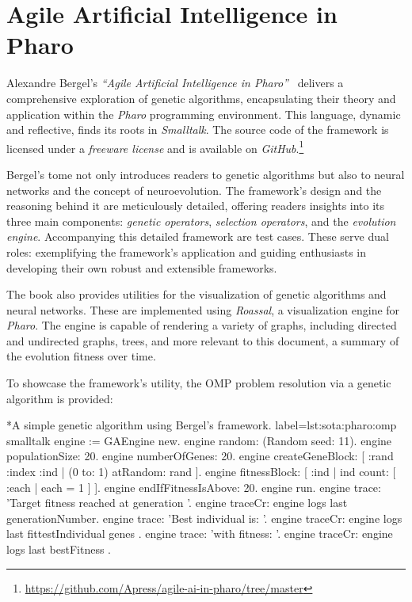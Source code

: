 
\section{Agile Artificial Intelligence in Pharo}
\label{sec:sota:pharo}
  Alexandre Bergel's \emph{\enquote{Agile Artificial Intelligence in 
  Pharo}}~\autocite{bergelAgileArtificialIntelligence2020} delivers a 
  comprehensive exploration of genetic algorithms, encapsulating their theory 
  and application within the \textit{Pharo} programming environment.
  This language, dynamic and reflective, finds its roots in \textit{Smalltalk}.
  The source code of the framework is licensed under a \textit{freeware license}
  and is available on 
  \textit{GitHub}.\footnote{\url{https://github.com/Apress/agile-ai-in-pharo/tree/master}}

  Bergel's tome not only introduces readers to genetic algorithms but also to 
  neural networks and the concept of neuroevolution.
  The framework's design and the reasoning behind it are meticulously detailed, 
  offering readers insights into its three main components: \emph{genetic 
  operators}, \emph{selection operators}, and the \emph{evolution engine}.
  Accompanying this detailed framework are test cases.
  These serve dual roles: exemplifying the framework's application and guiding 
  enthusiasts in developing their own robust and extensible frameworks.

  The book also provides utilities for the visualization of genetic algorithms
  and neural networks.
  These are implemented using \textit{Roassal}, a visualization engine for
  \textit{Pharo}.
  The engine is capable of rendering a variety of graphs, including directed and
  undirected graphs, trees, and more relevant to this document, a summary of the
  evolution fitness over time.
  
  To showcase the framework's utility, the OMP problem resolution via a genetic 
  algorithm is provided:

  \begin{code}*{A simple genetic algorithm using Bergel's framework.}{
    label=lst:sota:pharo:omp
  }{smalltalk}
    engine := GAEngine new.
    engine random: (Random seed: 11).
    engine populationSize: 20.
    engine numberOfGenes: 20.
    engine createGeneBlock: [ :rand :index :ind |
      (0 to: 1) atRandom: rand ].
    engine fitnessBlock: [ :ind | ind count: [ :each | each = 1 ] ].
    engine endIfFitnessIsAbove: 20.
    engine run.
    engine trace: 'Target fitness reached at generation '.
    engine traceCr: engine logs last generationNumber.
    engine trace: 'Best individual is: '.
    engine traceCr: engine logs last fittestIndividual genes .
    engine trace: 'with fitness: '.
    engine traceCr: engine logs last bestFitness .
  \end{code}

